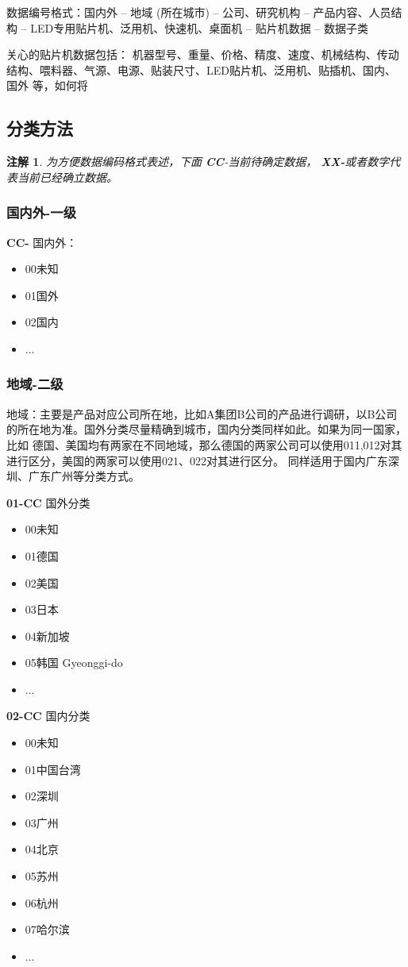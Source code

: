 \documentclass[a4paper,12pt,UTF8]{article}
\newtheorem{remark}{注解}
\begin{document}
数据编号格式：国内外 -- 地域 (所在城市) -- 公司、研究机构 -- 产品内容、人员结构 -- LED专用贴片机、泛用机、快速机、桌面机 -- 贴片机数据 -- 数据子类

关心的贴片机数据包括：
机器型号、重量、价格、精度、速度、机械结构、传动结构、喂料器、气源、电源、贴装尺寸、LED贴片机、泛用机、贴插机、国内、国外 等，如何将


\subsection{分类方法}

\begin{remark}
为方便数据编码格式表述，下面
\textbf{CC}-当前待确定数据， \textbf{XX-}或者数字代表当前已经确立数据。
\end{remark}

\subsubsection{国内外-一级}
\textbf{{CC-}} 国内外：
\begin{itemize}
  \item 00未知%
  \item 01国外%
  \item 02国内%
  \item ...
\end{itemize}

\subsubsection{地域-二级}

地域：主要是产品对应公司所在地，比如A集团B公司的产品进行调研，以B公司的所在地为准。国外分类尽量精确到城市，国内分类同样如此。如果为同一国家，比如 德国、美国均有两家在不同地域，那么德国的两家公司可以使用011,012对其进行区分，美国的两家可以使用021、022对其进行区分。 同样适用于国内广东深圳、广东广州等分类方式。

\textbf{01-CC} 国外分类
\begin{itemize}
  \item 00未知%
  \item 01德国%
  \item 02美国%
  \item 03日本%
  \item 04新加坡
  \item 05韩国 Gyeonggi-do
  \item ...
\end{itemize}

\textbf{02-CC} 国内分类
\begin{itemize}
  \item 00未知%
  \item 01中国台湾
  \item 02深圳
  \item 03广州
  \item 04北京
  \item 05苏州
  \item 06杭州
  \item 07哈尔滨
  \item ...
\end{itemize}
\end{document}

